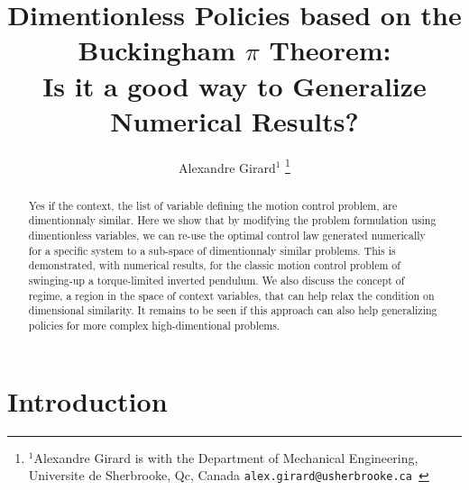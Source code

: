 

\title{\LARGE \bf
Dimentionless Policies based on the Buckingham $\pi$ Theorem: \\ 
Is it a good way to Generalize Numerical Results?
}


\author{Alexandre Girard$^{1}$%
\thanks{$^{1}$Alexandre Girard is with the Department of Mechanical Engineering, Universite de Sherbrooke, Qc, Canada {\tt\small  alex.girard@usherbrooke.ca }}%
}%


\maketitle
\thispagestyle{empty}
\pagestyle{empty}


\begin{abstract}
Yes if the context, the list of variable defining the motion control problem, are dimentionnaly similar. Here we show that by modifying the problem formulation using dimentionless variables, we can re-use the optimal control law generated numerically for a specific system to a sub-space of dimentionnaly similar problems. This is demonstrated, with numerical results, for the classic motion control problem of swinging-up a torque-limited inverted pendulum. %
We also discuss the concept of regime, a region in the space of context variables, that can help relax the condition on dimensional similarity. 
It remains to be seen if this approach can also help generalizing policies for more complex high-dimentional problems.
\end{abstract}

\section{Introduction}


